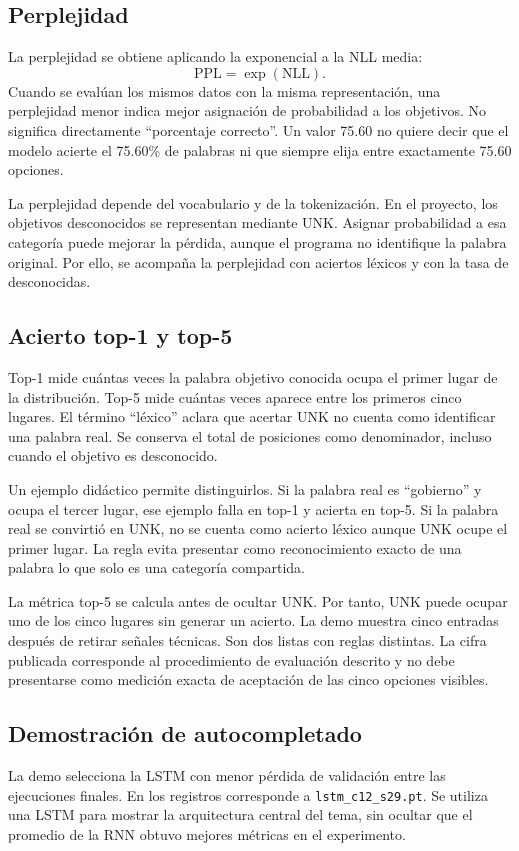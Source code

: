 \subsection{Perplejidad}
La perplejidad se obtiene aplicando la exponencial a la NLL media:
\begin{equation}\label{eq:ppl_nueva}
\mathrm{PPL}=\exp(\mathrm{NLL}).
\end{equation}
Cuando se evalúan los mismos datos con la misma representación, una perplejidad menor indica mejor asignación de probabilidad a los objetivos. No significa directamente ``porcentaje correcto''. Un valor 75.60 no quiere decir que el modelo acierte el 75.60\% de palabras ni que siempre elija entre exactamente 75.60 opciones.

La perplejidad depende del vocabulario y de la tokenización. En el proyecto, los objetivos desconocidos se representan mediante UNK. Asignar probabilidad a esa categoría puede mejorar la pérdida, aunque el programa no identifique la palabra original. Por ello, se acompaña la perplejidad con aciertos léxicos y con la tasa de desconocidas.

\subsection{Acierto top-1 y top-5}
Top-1 mide cuántas veces la palabra objetivo conocida ocupa el primer lugar de la distribución. Top-5 mide cuántas veces aparece entre los primeros cinco lugares. El término ``léxico'' aclara que acertar UNK no cuenta como identificar una palabra real. Se conserva el total de posiciones como denominador, incluso cuando el objetivo es desconocido.

Un ejemplo didáctico permite distinguirlos. Si la palabra real es ``gobierno'' y ocupa el tercer lugar, ese ejemplo falla en top-1 y acierta en top-5. Si la palabra real se convirtió en UNK, no se cuenta como acierto léxico aunque UNK ocupe el primer lugar. La regla evita presentar como reconocimiento exacto de una palabra lo que solo es una categoría compartida.

La métrica top-5 se calcula antes de ocultar UNK. Por tanto, UNK puede ocupar uno de los cinco lugares sin generar un acierto. La demo muestra cinco entradas después de retirar señales técnicas. Son dos listas con reglas distintas. La cifra publicada corresponde al procedimiento de evaluación descrito y no debe presentarse como medición exacta de aceptación de las cinco opciones visibles.

\subsection{Demostración de autocompletado}
La demo selecciona la LSTM con menor pérdida de validación entre las ejecuciones finales. En los registros corresponde a \texttt{lstm\_c12\_s29.pt}. Se utiliza una LSTM para mostrar la arquitectura central del tema, sin ocultar que el promedio de la RNN obtuvo mejores métricas en el experimento.

